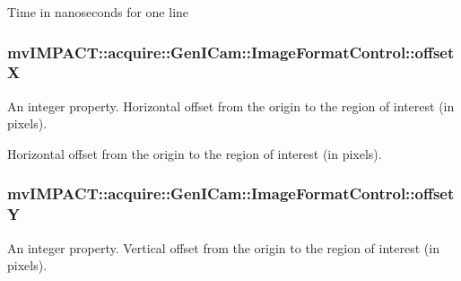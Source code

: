 Time in nanoseconds for one line \hypertarget{classmv_i_m_p_a_c_t_1_1acquire_1_1_gen_i_cam_1_1_image_format_control_ae60f5a436f0da44d0afa63e489c56bea}{
\subsubsection[{offset\+X}]{ mv\+I\+M\+P\+A\+C\+T\+::acquire\+::\+Gen\+I\+Cam\+::\+Image\+Format\+Control\+::offset\+X}}\label{classmv_i_m_p_a_c_t_1_1acquire_1_1_gen_i_cam_1_1_image_format_control_ae60f5a436f0da44d0afa63e489c56bea}


An integer property. Horizontal offset from the origin to the region of interest (in pixels). 

Horizontal offset from the origin to the region of interest (in pixels). \hypertarget{classmv_i_m_p_a_c_t_1_1acquire_1_1_gen_i_cam_1_1_image_format_control_af37364805be675d07c59be811b50cda3}{
\subsubsection[{offset\+Y}]{ mv\+I\+M\+P\+A\+C\+T\+::acquire\+::\+Gen\+I\+Cam\+::\+Image\+Format\+Control\+::offset\+Y}}\label{classmv_i_m_p_a_c_t_1_1acquire_1_1_gen_i_cam_1_1_image_format_control_af37364805be675d07c59be811b50cda3}


An integer property. Vertical offset from the origin to the region of interest (in pixels). 

